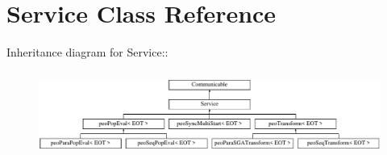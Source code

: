\hypertarget{classService}{
\section{Service Class Reference}
\label{classService}
}
Inheritance diagram for Service::\begin{figure}[H]
\begin{center}
\leavevmode
\includegraphics[height=2.8cm]{classService}
\end{center}
\end{figure}
